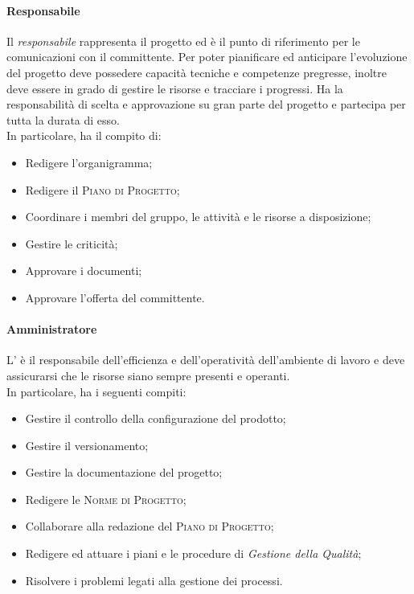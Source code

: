 \paragraph{Responsabile}

Il \emph{responsabile} rappresenta il progetto ed è il punto di riferimento per le comunicazioni con il committente. 
Per poter pianificare ed anticipare l'evoluzione del progetto deve possedere capacità tecniche e competenze 
pregresse, inoltre deve essere in grado di gestire le risorse e tracciare i progressi. Ha la responsabilità di scelta e 
approvazione su gran parte del progetto e partecipa per tutta la durata di esso.\\
In particolare, ha il compito di:
\begin{itemize}
    \item Redigere l'organigramma;
    \item Redigere il \textsc{Piano di Progetto};
    \item Coordinare i membri del gruppo, le attività e le risorse a disposizione;
    \item Gestire le criticità;
    \item Approvare i documenti;
    \item Approvare l'offerta del committente.
\end{itemize}

\paragraph{Amministratore}

L'\emph{} è il responsabile dell'efficienza e dell'operatività dell'ambiente di lavoro e 
deve assicurarsi che le risorse siano sempre presenti e operanti.\\
In particolare, ha i seguenti compiti:
\begin{itemize}
    \item Gestire il controllo della configurazione del prodotto;
    \item Gestire il versionamento;
    \item Gestire la documentazione del progetto;
    \item Redigere le \textsc{Norme di Progetto};
    \item Collaborare alla redazione del \textsc{Piano di Progetto};
    \item Redigere ed attuare i piani e le procedure di \emph{Gestione della Qualità};
    \item Risolvere i problemi legati alla gestione dei processi.
\end{itemize}
    
